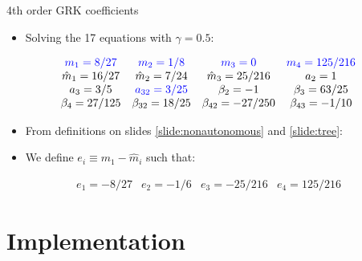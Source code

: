 \documentclass[serif]{beamer}
\begin{document}
\begin{frame}{4th order GRK coefficients}
  \begin{itemize}
   \item Solving the 17 equations with $\gamma = 0.5$:
  \end{itemize}
  \begin{equation}
    \begin{array}{cccc}
      \nonumber
      \color{blue} m_1 = 8/27 & \color{blue} m_ 2 = 1/8 & \color{blue} m_3 = 0 & \color{blue} m_4 = 125/216 \\
      \color{black}\hat{m}_1 = 16/27 & \hat{m}_ 2 = 7/24 & \hat{m}_3 = 25/216 & a_2 = 1 \\
      a_3 = 3/5 & \color{blue}{a_{32} = 3/25} & \beta_2 = -1 & \beta_3 = 63/25 \\
      \beta_4 = 27/125 & \beta_{32} = 18/25 & \beta_{42} = -27/250 & \beta_{43} = -1/10
    \end{array}
  \end{equation}
  \begin{itemize}
   \item From definitions on slides \ref{slide:nonautonomous} and \ref{slide:tree}:
  \end{itemize}
  \begin{itemize}
   \item We define $e_i \equiv m_1 - \hat{m}_i$ such that:
  \end{itemize}
  \begin{equation}
    \begin{array}{cccc}
      \nonumber
      e_1 = -8/27 & e_2 = -1/6 & e_3 = -25/216 & e_4 = 125/216
    \end{array}
  \end{equation}
\end{frame}

\section{Implementation}
\end{document}
